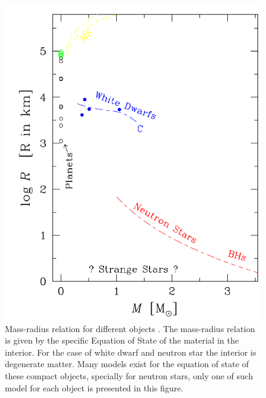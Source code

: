 \begin{figure}
                \centering
                \includegraphics[scale=0.3]{assets/images/mass-radius.png}
                \caption{Mass-radius relation for different objects \citep{de2008stars}. The mass-radius relation is given by the specific Equation of State of the material in the interior. For the case of white dwarf and neutron star the interior is degenerate matter. Many models exist for the equation of state of these compact objects, specially for neutron stars, only one of such model for each object is presented in this figure.}
                \label{fig:massrad}
\end{figure}

